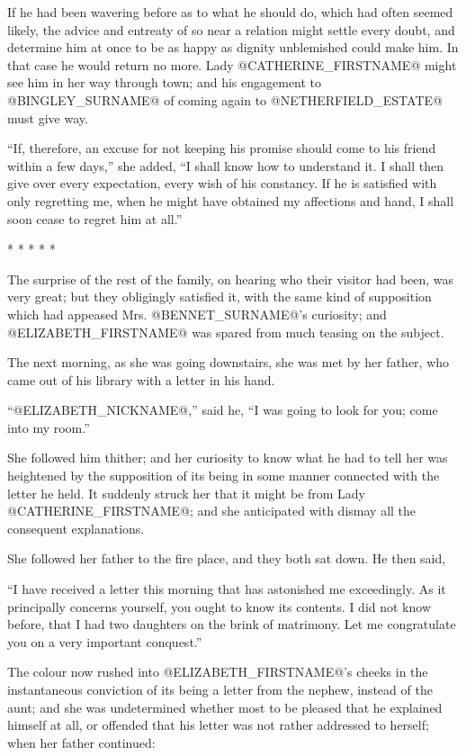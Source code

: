If he had been wavering before as to what he should do, which had often
seemed likely, the advice and entreaty of so near a relation might
settle every doubt, and determine him at once to be as happy as dignity
unblemished could make him. In that case he would return no more. Lady
@CATHERINE_FIRSTNAME@ might see him in her way through town; and his engagement to
@BINGLEY_SURNAME@ of coming again to @NETHERFIELD_ESTATE@ must give way.

``If, therefore, an excuse for not keeping his promise should come to his
friend within a few days,'' she added, ``I shall know how to understand
it. I shall then give over every expectation, every wish of his
constancy. If he is satisfied with only regretting me, when he might
have obtained my affections and hand, I shall soon cease to regret him
at all.''

                          * * * * *

The surprise of the rest of the family, on hearing who their visitor had
been, was very great; but they obligingly satisfied it, with the same
kind of supposition which had appeased Mrs. @BENNET_SURNAME@'s curiosity; and
@ELIZABETH_FIRSTNAME@ was spared from much teasing on the subject.

The next morning, as she was going downstairs, she was met by her
father, who came out of his library with a letter in his hand.

``@ELIZABETH_NICKNAME@,'' said he, ``I was going to look for you; come into my room.''

She followed him thither; and her curiosity to know what he had to
tell her was heightened by the supposition of its being in some manner
connected with the letter he held. It suddenly struck her that it
might be from Lady @CATHERINE_FIRSTNAME@; and she anticipated with dismay all the
consequent explanations.

She followed her father to the fire place, and they both sat down. He
then said,

``I have received a letter this morning that has astonished me
exceedingly. As it principally concerns yourself, you ought to know its
contents. I did not know before, that I had two daughters on the brink
of matrimony. Let me congratulate you on a very important conquest.''

The colour now rushed into @ELIZABETH_FIRSTNAME@'s cheeks in the instantaneous
conviction of its being a letter from the nephew, instead of the aunt;
and she was undetermined whether most to be pleased that he explained
himself at all, or offended that his letter was not rather addressed to
herself; when her father continued:

